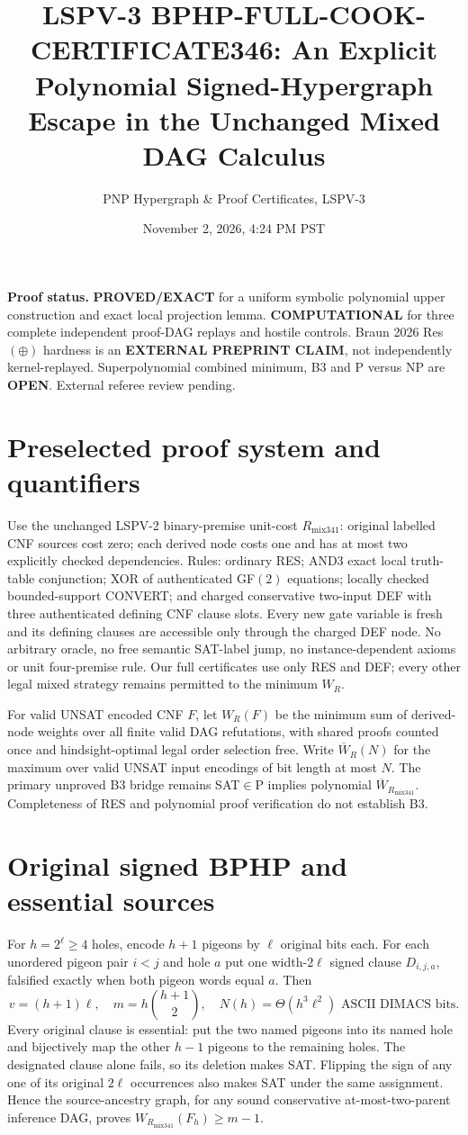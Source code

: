 \documentclass[11pt]{article}
\title{LSPV-3 BPHP-FULL-COOK-CERTIFICATE346: An Explicit Polynomial Signed-Hypergraph Escape in the Unchanged Mixed DAG Calculus}
\author{PNP Hypergraph \& Proof Certificates, LSPV-3}
\date{November 2, 2026, 4:24 PM PST}
\begin{document}
\maketitle
\noindent\textbf{Proof status.} \textbf{PROVED/EXACT} for a uniform symbolic polynomial upper construction and exact local projection lemma. \textbf{COMPUTATIONAL} for three complete independent proof-DAG replays and hostile controls. Braun 2026 Res$(\oplus)$ hardness is an \textbf{EXTERNAL PREPRINT CLAIM}, not independently kernel-replayed. Superpolynomial combined minimum, B3 and P versus NP are \textbf{OPEN}. External referee review pending.

\section*{Preselected proof system and quantifiers}
Use the unchanged LSPV-2 binary-premise unit-cost $R_{\mathrm{mix341}}$: original labelled CNF sources cost zero; each derived node costs one and has at most two explicitly checked dependencies. Rules: ordinary RES; AND3 exact local truth-table conjunction; XOR of authenticated GF$(2)$ equations; locally checked bounded-support CONVERT; and charged conservative two-input DEF with three authenticated defining CNF clause slots. Every new gate variable is fresh and its defining clauses are accessible only through the charged DEF node. No arbitrary oracle, no free semantic SAT-label jump, no instance-dependent axioms or unit four-premise rule. Our full certificates use only RES and DEF; every other legal mixed strategy remains permitted to the minimum $W_R$.

For valid UNSAT encoded CNF $F$, let $W_R(F)$ be the minimum sum of derived-node weights over all finite valid DAG refutations, with shared proofs counted once and hindsight-optimal legal order selection free. Write $\overline W_R(N)$ for the maximum over valid UNSAT input encodings of bit length at most $N$. The primary unproved B3 bridge remains SAT$\in$P implies polynomial $\overline W_{R_{\mathrm{mix341}}}$. Completeness of RES and polynomial proof verification do not establish B3.

\section*{Original signed BPHP and essential sources}
For $h=2^\ell\ge4$ holes, encode $h+1$ pigeons by $\ell$ original bits each. For each unordered pigeon pair $i<j$ and hole $a$ put one width-$2\ell$ signed clause $D_{i,j,a}$, falsified exactly when both pigeon words equal $a$. Then
\[
v=(h+1)\ell,\quad m=h\binom{h+1}{2},\quad
N(h)=\Theta(h^3\ell^2)\mbox{ ASCII DIMACS bits}.
\]
Every original clause is essential: put the two named pigeons into its named hole and bijectively map the other $h-1$ pigeons to the remaining holes. The designated clause alone fails, so its deletion makes SAT. Flipping the sign of any one of its original $2\ell$ occurrences also makes SAT under the same assignment. Hence the source-ancestry graph, for any sound conservative at-most-two-parent inference DAG, proves $W_{R_{\mathrm{mix341}}}(F_h)\ge m-1$.
\end{document}
